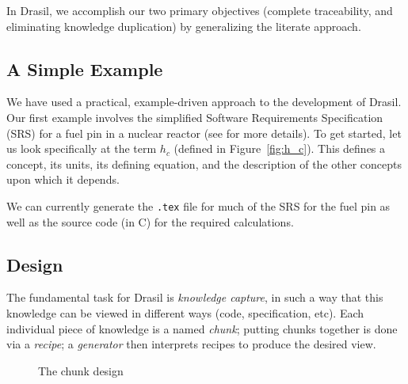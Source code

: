 \documentclass{sig-alternate-05-2015}
\newcommand{\lss}{Drasil}
\begin{document}
In \lss, we accomplish our two primary objectives (complete traceability, and
eliminating knowledge duplication) by generalizing the literate approach.

\subsection{A Simple Example} \label{ssec:example}

We have used a practical, example-driven approach to the development of \lss{}.
Our first example involves 
the simplified Software Requirements Specification (SRS) for a fuel pin in a
nuclear reactor (see \cite{SmithAndKoothoor2016} for more details). To get
started, let us look specifically at the term $h_c$ (defined in
Figure~\ref{fig:h_c}).  This defines a concept, its units, its
defining equation, and the description of the other concepts upon which it
depends.

We can currently generate the \verb|.tex| file for
much of the SRS for the fuel pin as well as the source code (in C) for the
required calculations.

\subsection{Design} \label{sssec:ex_how}

The fundamental task for \lss{} is \emph{knowledge capture}, in such a 
way that this knowledge can be viewed in different ways (code, specification,
etc).  Each individual piece of knowledge is a named \textit{chunk}; putting
chunks together is done via a \textit{recipe}; a \textit{generator} then
interprets recipes to produce the desired view.  

\begin{figure}
\begin{center}
\end{center}
\caption{The chunk design}
\label{fig:chunks}
\end{figure}
\end{document}
